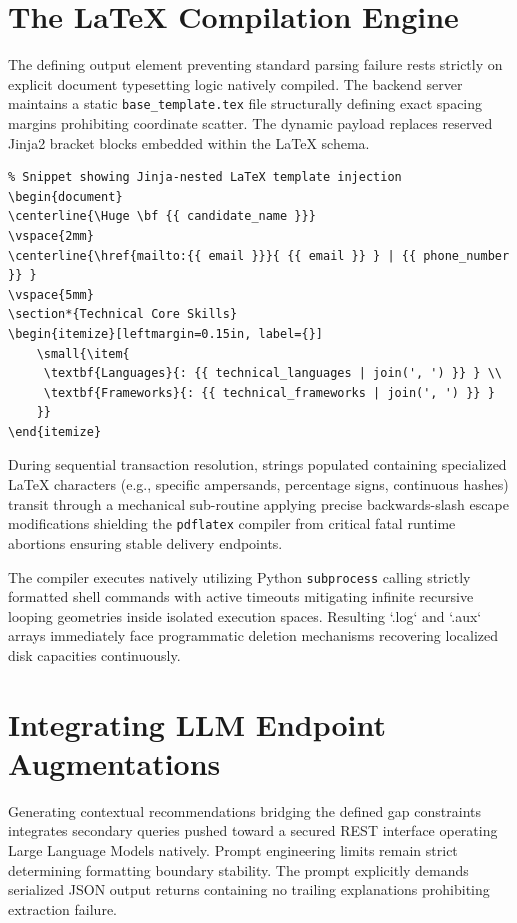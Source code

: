 \documentclass[12pt,a4paper]{report}
\begin{document}
\section{The LaTeX Compilation Engine}
The defining output element preventing standard parsing failure rests strictly on explicit document typesetting logic natively compiled. The backend server maintains a static \texttt{base\_template.tex} file structurally defining exact spacing margins prohibiting coordinate scatter. The dynamic payload replaces reserved Jinja2 bracket blocks embedded within the LaTeX schema.

\begin{verbatim}
% Snippet showing Jinja-nested LaTeX template injection
\begin{document}
\centerline{\Huge \bf {{ candidate_name }}}
\vspace{2mm}
\centerline{\href{mailto:{{ email }}}{ {{ email }} } | {{ phone_number }} }
\vspace{5mm}
\section*{Technical Core Skills}
\begin{itemize}[leftmargin=0.15in, label={}]
    \small{\item{
     \textbf{Languages}{: {{ technical_languages | join(', ') }} } \\
     \textbf{Frameworks}{: {{ technical_frameworks | join(', ') }} } 
    }}
\end{itemize}
\end{verbatim}

During sequential transaction resolution, strings populated containing specialized LaTeX characters (e.g., specific ampersands, percentage signs, continuous hashes) transit through a mechanical sub-routine applying precise backwards-slash escape modifications shielding the \texttt{pdflatex} compiler from critical fatal runtime abortions ensuring stable delivery endpoints.

The compiler executes natively utilizing Python \texttt{subprocess} calling strictly formatted shell commands with active timeouts mitigating infinite recursive looping geometries inside isolated execution spaces. Resulting `.log` and `.aux` arrays immediately face programmatic deletion mechanisms recovering localized disk capacities continuously.

\section{Integrating LLM Endpoint Augmentations}
Generating contextual recommendations bridging the defined gap constraints integrates secondary queries pushed toward a secured REST interface operating Large Language Models natively. Prompt engineering limits remain strict determining formatting boundary stability. The prompt explicitly demands serialized JSON output returns containing no trailing explanations prohibiting extraction failure.
\end{document}

